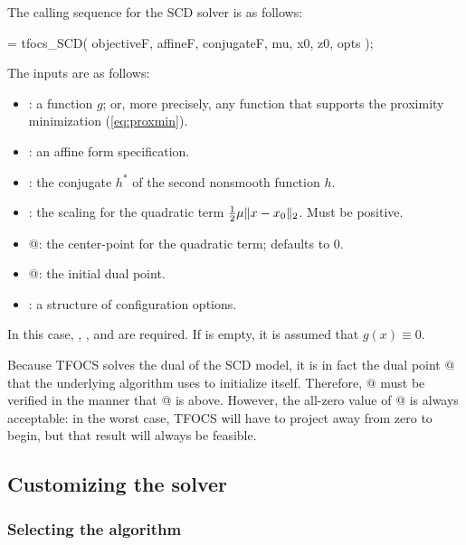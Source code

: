 \documentclass{article}
\begin{document}
The calling sequence for the SCD solver is as follows:
\begin{code}
	[ x, out ] = tfocs_SCD( objectiveF, affineF, conjugateF, mu, x0, z0, opts );
\end{code}
The inputs are as follows:
\begin{itemize}
\item \verb@objectiveF@: a function $g$; 
or, more precisely, any
function that supports the proximity minimization (\ref{eq:proxmin}).
\item \verb@affineF@: an affine form specification.
\item \verb@conjugateF@: the conjugate $h^*$ of the second nonsmooth function $h$.
\item \verb@mu@: the scaling for the quadratic term ${\textstyle\frac{1}{2}}\mu\|x-x_0\|_2$. Must be positive.
\item {}@: the center-point for the quadratic term; defaults to 0.
\item {}@: the initial dual point.
\item \verb@opts@: a structure of configuration options.
\end{itemize}
In this case, \verb@affineF@, \verb@conjugateF@, and \verb@mu@ are required.
If \verb@objectiveF@ is empty, it is assumed that $g(x)\equiv 0$. 

Because TFOCS solves the dual of the SCD model, it is in fact the dual point
@ that the underlying algorithm uses to initialize itself. Therefore,
@ must be verified in the manner that @ is above. However,
the all-zero value of @ is always acceptable:
in the worst case, TFOCS will have to project away from zero to begin,
but that result will always be feasible.

\subsection{Customizing the solver}

\subsubsection{Selecting the algorithm}
\end{document}
